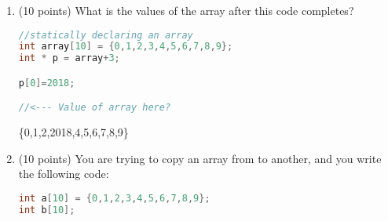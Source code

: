 \documentclass{article}[9pt]
\newenvironment{answerfont}{\fontfamily{qhv}\selectfont}{\par}
\newenvironment{myanswer}{\begin{mdframed}\begin{answerfont}}{\end{answerfont}\end{mdframed}}
\begin{document}
\begin{enumerate}
\begin{lstlisting}[language=c]
(*p)++; /* (4) */
\end{lstlisting}

Mark 0 Diagram
\begin{verbatim}
.----.----.
| a  |  0 | 
|----|----| 
| b  |  0 | <-.
|----|----|   |
| p  |  .-+---'
'----'----'
\end{verbatim}

\begin{myanswer}
Mark 1 Diagram
\begin{verbatim}
.----.----.
| a  |  0 | 
|----|----| 
| b  |15  | <-.
|----|----|   |
| p  |  .-+---'
'----'----'
\end{verbatim}

Mark 2 Diagram
\begin{verbatim}
.----.----.
| a  | 15 | 
|----|----| 
| b  | 25 | <-.
|----|----|   |
| p  |  .-+---'
'----'----'
\end{verbatim}

Mark 3 Diagram
\begin{verbatim}
.----.----.
| a  | 15 | <-.
|----|----|   |
| b  | 25 |   |
|----|----|   |
| p  |  .-+---'
'----'----'
\end{verbatim}

Mark 4 Diagram
\begin{verbatim}
.----.----.
| a  | 16 | <-.
|----|----|   |
| b  | 15 |   |
|----|----|   |
| p  |  .-+---'
'----'----'
\end{verbatim}
\end{myanswer}

\item (10 points) What is the values of the array after this code completes?

\begin{lstlisting}[language=c]
//statically declaring an array
int array[10] = {0,1,2,3,4,5,6,7,8,9};
int * p = array+3;

p[0]=2018;

//<--- Value of array here?
\end{lstlisting}

\begin{myanswer}
\{0,1,2,2018,4,5,6,7,8,9\}
\end{myanswer}

\item (10 points) You are trying to copy an array from to another, and you write the following code:

\begin{lstlisting}[language=c]
int a[10] = {0,1,2,3,4,5,6,7,8,9};
int b[10];


\end{lstlisting}
\end{enumerate}
\end{document}
